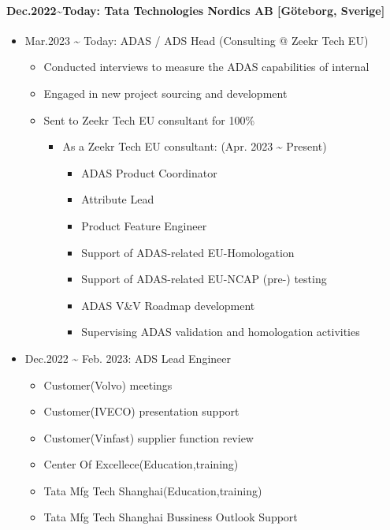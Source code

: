 \documentclass[12pt,a4paper]{article}
\begin{document}
\paragraph{Dec.2022{\textasciitilde}Today: Tata Technologies Nordics AB [Göteborg, Sverige]}
\begin{itemize}
\item Mar.2023 {\textasciitilde} Today: ADAS / ADS Head (Consulting @ Zeekr Tech EU)

\begin{itemize}
\item Conducted interviews to measure the ADAS capabilities of internal


\item Engaged in new project sourcing and development 


\item Sent to Zeekr Tech EU consultant for 100\%

\begin{itemize}
\item As a Zeekr Tech EU consultant: (Apr. 2023 {\textasciitilde} Present)

\begin{itemize}
\item ADAS Product Coordinator 


\item Attribute Lead 


\item Product Feature Engineer 


\item Support of ADAS-related EU-Homologation


\item Support of ADAS-related EU-NCAP (pre-) testing


\item ADAS V\&V Roadmap development


\item Supervising ADAS validation and homologation activities

\end{itemize}
\end{itemize}
\end{itemize}

\item Dec.2022 {\textasciitilde} Feb. 2023: ADS Lead Engineer 

\begin{itemize}
\item Customer(Volvo) meetings


\item Customer(IVECO) presentation support


\item Customer(Vinfast) supplier function review


\item Center Of Excellece(Education,training)


\item Tata Mfg Tech Shanghai(Education,training)


\item Tata Mfg Tech Shanghai Bussiness Outlook Support

\end{itemize}
\end{itemize}
\end{document}
